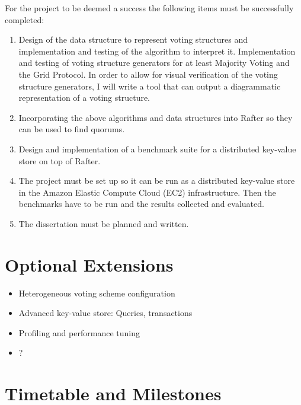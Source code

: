 \documentclass[12pt]{scrartcl}
\begin{document}
For the project to be deemed a success the following items must be successfully completed:

\begin{enumerate}

\item Design of the data structure to represent voting structures and implementation and testing of the algorithm to interpret it. Implementation and testing of voting structure generators for at least Majority Voting and the Grid Protocol. In order to allow for visual verification of the voting structure generators, I will write a tool that can output a diagrammatic representation of a voting structure.

\item Incorporating the above algorithms and data structures into Rafter so they can be used to find quorums.

\item Design and implementation of a benchmark suite for a distributed key-value store on top of Rafter.

\item The project must be set up so it can be run as a distributed key-value store in the Amazon Elastic Compute Cloud (EC2) infrastructure. Then the benchmarks have to be run and the results collected and evaluated.

\item The dissertation must be planned and written.

\end{enumerate}

\section{Optional Extensions%
  \label{optional-extensions}%
}
%
\begin{itemize}

\item Heterogeneous voting scheme configuration

\item Advanced key-value store: Queries, transactions

\item Profiling and performance tuning

\item ?

\end{itemize}


\section{Timetable and Milestones%
  \label{timetable-and-milestones}%
}
\end{document}
